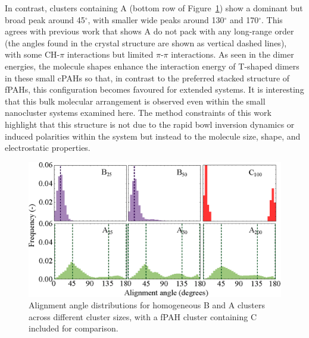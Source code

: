 In contrast, clusters containing A (bottom row of Figure~\ref{fig:alignmentangles_homo}) show a dominant but broad peak around 45$^{\circ}$, with smaller wide peaks around 130$^{\circ}$ and 170$^{\circ}$. 
This agrees with previous work that shows A do not pack with any long-range order~\cite{hanson1976crystal,Petrukhina2005,kanao2018differentiating,wang2015electronic,scott1999geodesic} (the angles found in the crystal structure are shown as vertical dashed lines), with some CH-$\pi$ interactions but limited $\pi$-$\pi$ interactions. As seen in the dimer energies, the molecule shapes enhance the interaction energy of T-shaped dimers in these small cPAHs so that, in contrast to the preferred stacked structure of fPAHs, this configuration becomes favoured for extended systems. It is interesting that this bulk molecular arrangement is observed even within the small nanocluster systems examined here. The method constraints of this work highlight that this structure is not due to the rapid bowl inversion dynamics or induced polarities within the system but instead to the molecule size, shape, and electrostatic properties.

%
\begin{figure}[!tbh]
\centering
\includegraphics[width=0.84\linewidth]{Figures/alignment_angles_homo.eps}
\caption{Alignment angle distributions for homogeneous B and A clusters across different cluster sizes, with a fPAH cluster containing C included for comparison.}
\label{fig:alignmentangles_homo}
\end{figure}
%

